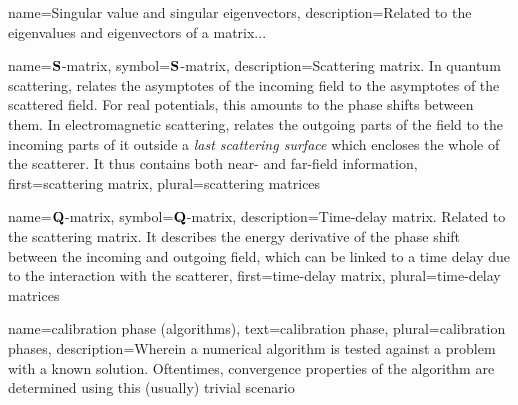 
%
{%
  name={Singular value and singular eigenvectors},
  description={Related to the eigenvalues and eigenvectors of a matrix...}
}

%
{%
  name={$\mathbf{S}$-matrix},
  symbol={$\mathbf{S}$-matrix},
  description={Scattering matrix. In quantum scattering, relates the asymptotes of the
  				incoming field to the asymptotes of the scattered field. For real potentials,
  				this amounts to the phase shifts between them. In electromagnetic scattering,
  				relates the outgoing parts of the field to the incoming parts of it outside 
  				a \textit{last scattering surface} which encloses the whole of the scatterer.
  				It thus contains both near- and far-field information},
  first={scattering matrix},
  plural={scattering matrices}
}

%
{%
  name={$\mathbf{Q}$-matrix},
  symbol={$\mathbf{Q}$-matrix},
  description={Time-delay matrix. Related to the scattering matrix. 
  				It describes the energy derivative of the phase
  				shift between the incoming and outgoing field, which
  				can be linked to a time delay due to the interaction
  				with the scatterer},
  first={time-delay matrix},
  plural={time-delay matrices}
}

%
{%
  name={calibration phase (algorithms)},
  text={calibration phase},
  plural={calibration phases},
  description={Wherein a numerical algorithm is tested against a problem with a%
		known solution. Oftentimes, convergence properties of the algorithm
		are determined using this (usually) trivial scenario}
}

